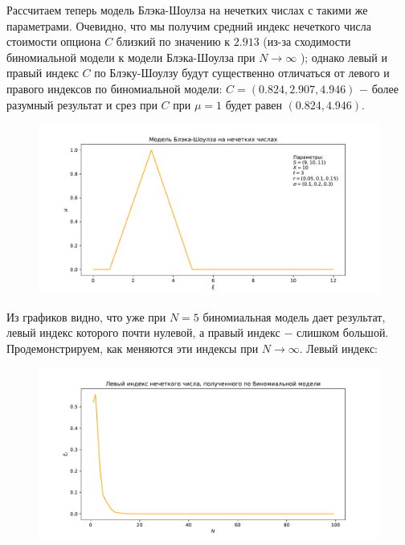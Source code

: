 \documentclass[a4paper,12pt]{extarticle} %
\begin{document}
	Рассчитаем теперь модель Блэка-Шоулза на нечетких числах с такими же параметрами. Очевидно, что мы получим средний индекс нечеткого числа стоимости опциона $C$ близкий по значению к $2.913$ (из-за сходимости биномиальной модели к модели Блэка-Шоулза при $N \to \infty$ \cite{1}); однако левый и правый индекс $C$ по Блэку-Шоулзу будут существенно отличаться от левого и правого индексов по биномиальной модели: $C=(0.824, 2.907, 4.946)$ $-$ более разумный результат и срез при $C$ при $\mu=1$ будет равен $(0.824, 4.946)$. 
	\begin{figure}[H]
		\centering
		\includegraphics[width=\textwidth]{_images/fuzzy-black-scholes.pdf}
	\end{figure}
	
	Из графиков видно, что уже при $N=5$ биномиальная модель дает результат, левый индекс которого почти нулевой, а правый индекс $-$ слишком большой. Продемонстрируем, как меняются эти индексы при $N \to \infty$. Левый индекс:
	\begin{figure}[H]
		\centering
		\includegraphics[width=\textwidth]{_images/left-fuzzy-binomial.pdf}
	\end{figure}
	
\end{document}
